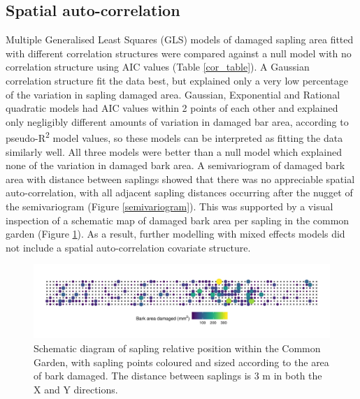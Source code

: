 \documentclass[a4paper, 11pt]{article}
\begin{document}
\subsection*{Spatial auto-correlation}

Multiple Generalised Least Squares (GLS) models of damaged sapling area fitted with different correlation structures were compared against a null model with no correlation structure using AIC values (Table \ref{cor_table}). A Gaussian correlation structure fit the data best, but explained only a very low percentage of the variation in sapling damaged area. Gaussian, Exponential and Rational quadratic models had AIC values within 2 points of each other and explained only negligibly different amounts of variation in damaged bar area, according to pseudo-R\textsuperscript{2} model values, so these models can be interpreted as fitting the data similarly well. All three models were better than a null model which explained none of the variation in damaged bark area. A semivariogram of damaged bark area with distance between saplings showed that there was no appreciable spatial auto-correlation, with all adjacent sapling distances occurring after the nugget of the semivariogram (Figure \ref{semivariogram}). This was supported by a visual inspection of a schematic map of damaged bark area per sapling in the common garden (Figure \ref{sapling_map}). As a result, further modelling with mixed effects models did not include a spatial auto-correlation covariate structure.

\begin{figure}[H]
	\includegraphics[width=\textwidth]{sapling_map}
	\caption{Schematic diagram of sapling relative position within the Common Garden, with sapling points coloured and sized according to the area of bark damaged. The distance between saplings is 3 m in both the X and Y directions.}
	\label{sapling_map}
\end{figure}
\end{document}
